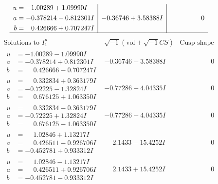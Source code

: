 \documentclass[1p]{elsarticle_modified}
\theoremstyle{definition}
\newcommand{\I}{\sqrt{-1}}
\begin{document}
$$\begin{array}{c|c|c}
\begin{aligned}
u &= -1.00289 + 1.09990 I \\
a &= -0.378214 - 0.812301 I \\
b &= \phantom{-}0.426666 + 0.707247 I\end{aligned}
 & -0.36746 + 3.58388 I & \phantom{-0.000000 } 0\\
 \hline 
 \end{array}$$\newpage$$\begin{array}{c|c|c}  
\text{Solutions to }I^u_{1}& \I (\text{vol} + \sqrt{-1}CS) & \text{Cusp shape}\\
 \hline 
\begin{aligned}
u &= -1.00289 - 1.09990 I \\
a &= -0.378214 + 0.812301 I \\
b &= \phantom{-}0.426666 - 0.707247 I\end{aligned}
 & -0.36746 - 3.58388 I & \phantom{-0.000000 } 0 \\ \hline\begin{aligned}
u &= \phantom{-}0.332834 + 0.363179 I \\
a &= -0.72225 - 1.32824 I \\
b &= \phantom{-}0.676125 + 1.063350 I\end{aligned}
 & -0.77286 - 4.04335 I & \phantom{-0.000000 } 0 \\ \hline\begin{aligned}
u &= \phantom{-}0.332834 - 0.363179 I \\
a &= -0.72225 + 1.32824 I \\
b &= \phantom{-}0.676125 - 1.063350 I\end{aligned}
 & -0.77286 + 4.04335 I & \phantom{-0.000000 } 0 \\ \hline\begin{aligned}
u &= \phantom{-}1.02846 + 1.13217 I \\
a &= \phantom{-}0.426511 - 0.926706 I \\
b &= -0.452781 + 0.933312 I\end{aligned}
 & \phantom{-}2.1433 - 15.4252 I & \phantom{-0.000000 } 0 \\ \hline\begin{aligned}
u &= \phantom{-}1.02846 - 1.13217 I \\
a &= \phantom{-}0.426511 + 0.926706 I \\
b &= -0.452781 - 0.933312 I\end{aligned}
 & \phantom{-}2.1433 + 15.4252 I & \phantom{-0.000000 } 0 \\ \hline\begin{aligned}

\end{aligned}
\end{array}$$
\end{document}
